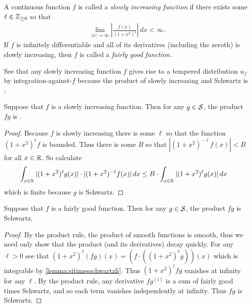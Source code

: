   \begin{defn}
    A continuous function $f$ is called a \emph{slowly increasing function} if there exists some $\ell\in\Z_{\ge0}$ so that
    \begin{align*}
      \lim_{|x|\rightarrow\infty} \left| \frac{f(x)}{(1+x^2)^{\ell}} \right| \,dx < \infty \text{.}
    \end{align*}
    If $f$ is infinitely differentiable and all of its derivatives (including the zeroth) is slowly increasing, then $f$ is called a \emph{fairly good function}.
  \end{defn}
  See that any slowly increasing function $f$ gives rise to a tempered distribution $u_f$ by integration-against-$f$ because the product of slowly increasing and Schwartz is \li:
  \begin{lemma}
    \label{lemma:sitimesschwartzli}
    Suppose that $f$ is a slowly increasing function.
    Then for any $g\in\S$, the product $fg$ is \li.
  \end{lemma}
  \begin{proof}
    Because $f$ is slowly increasing there is some $\ell$ so that the function $(1+x^2)^\ell f$ is bounded.
    Thus there is some $B$ so that $|(1+x^2)^{-\ell} f(x)|<B$ for all $x\in\R$.
    So calculate
    \begin{align*}
      \int_{x\in\R} |(1+x^2)^\ell g(x)|\cdot|(1+x^2)^{-\ell} f(x)|\,dx
      &\le B\cdot \int_{x\in\R} |(1+x^2)^\ell g(x)|\,dx
    \end{align*}
    which is finite because $g$ is Schwartz.
  \end{proof}
  \begin{lemma}
    Suppose that $f$ is a fairly good function.
    Then for any $g\in\S$, the product $fg$ is Schwartz.
  \end{lemma}
  \begin{proof}
    By the product rule, the product of smooth functions is smooth, thus we need only show that the product (and its derivatives) decay quickly.
    For any $\ell>0$ see that $(1+x^2)^\ell (fg)(x) = \left(f\cdot((1+x^2)^\ell g)\right)(x)$ which is integrable by \cref{lemma:sitimesschwartzli}.
    Thus $(1+x^2)^\ell fg$ vanishes at infinity for any $\ell$.
    By the product rule, any derivative $fg^{(i)}$ is a sum of fairly good times Schwartz, and so each term vanishes independently at infinity.
    Thus $fg$ is Schwartz.
  \end{proof}

